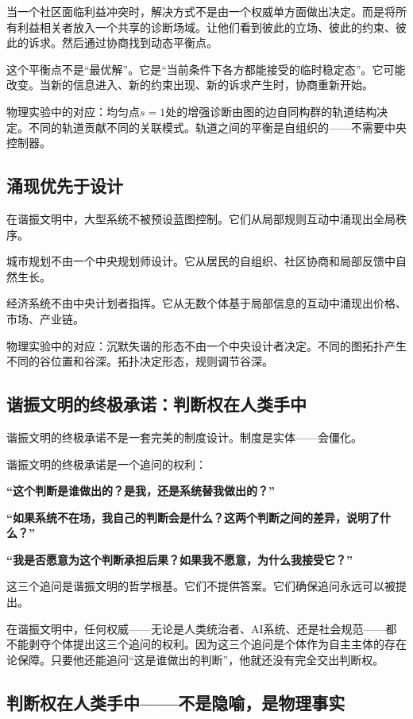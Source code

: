 \documentclass[11pt,a4paper]{book}
\theoremstyle{definition}
\begin{document}
当一个社区面临利益冲突时，解决方式不是由一个权威单方面做出决定。而是将所有利益相关者放入一个共享的诊断场域。让他们看到彼此的立场、彼此的约束、彼此的诉求。然后通过协商找到动态平衡点。

这个平衡点不是“最优解”。它是“当前条件下各方都能接受的临时稳定态”。它可能改变。当新的信息进入、新的约束出现、新的诉求产生时，协商重新开始。

物理实验中的对应：均匀点$s=1$处的增强诊断由图的边自同构群的轨道结构决定。不同的轨道贡献不同的关联模式。轨道之间的平衡是自组织的——不需要中央控制器。

\subsection{涌现优先于设计}

在谐振文明中，大型系统不被预设蓝图控制。它们从局部规则互动中涌现出全局秩序。

城市规划不由一个中央规划师设计。它从居民的自组织、社区协商和局部反馈中自然生长。

经济系统不由中央计划者指挥。它从无数个体基于局部信息的互动中涌现出价格、市场、产业链。

物理实验中的对应：沉默失谐的形态不由一个中央设计者决定。不同的图拓扑产生不同的谷位置和谷深。拓扑决定形态，规则调节谷深。

\subsection{谐振文明的终极承诺：判断权在人类手中}

谐振文明的终极承诺不是一套完美的制度设计。制度是实体——会僵化。

谐振文明的终极承诺是一个追问的权利：

\textbf{“这个判断是谁做出的？是我，还是系统替我做出的？”}

\textbf{“如果系统不在场，我自己的判断会是什么？这两个判断之间的差异，说明了什么？”}

\textbf{“我是否愿意为这个判断承担后果？如果我不愿意，为什么我接受它？”}

这三个追问是谐振文明的哲学根基。它们不提供答案。它们确保追问永远可以被提出。

在谐振文明中，任何权威——无论是人类统治者、AI系统、还是社会规范——都不能剥夺个体提出这三个追问的权利。因为这三个追问是个体作为自主主体的存在论保障。只要他还能追问“这是谁做出的判断”，他就还没有完全交出判断权。

\subsection{判断权在人类手中——不是隐喻，是物理事实}
\end{document}
